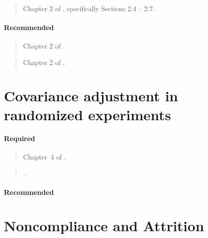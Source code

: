 \documentclass[12pt]{article}
\begin{document}
\begin{verse}
  Chapter 2 of , specifically Sections 2.4 -- 2.7.
\end{verse}

\paragraph*{Recommended}

\begin{verse}
  Chapter 2 of .
\end{verse}

\begin{verse}
  Chapter 2 of .
\end{verse}

\section{Covariance adjustment in randomized experiments}

\paragraph*{Required}

\begin{verse}
  Chapter~4 of .
\end{verse}

\begin{verse}
  .
\end{verse}

\begin{verse}  \end{verse}

\paragraph*{Recommended}

\begin{verse}  \end{verse}

\begin{verse}  \end{verse}

\begin{verse}  \end{verse}

\section{Noncompliance and Attrition}
\end{document}
